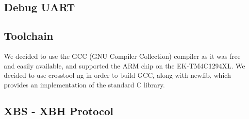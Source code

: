 \documentclass[twoside,11pt]{cergdoc}
\begin{document}
  \section{Debug UART}


  \section{Toolchain}
We decided to use the GCC (GNU Compiler Collection) compiler as it was free and
easily available, and supported the ARM chip on the EK-TM4C1294XL. We decided to
use crosstool-ng in order to build GCC, along with newlib, which provides an
implementation of the standard C library.

\begin{appendix}
\chapter{XBS - XBH Protocol}


\end{appendix}
\end{document}
